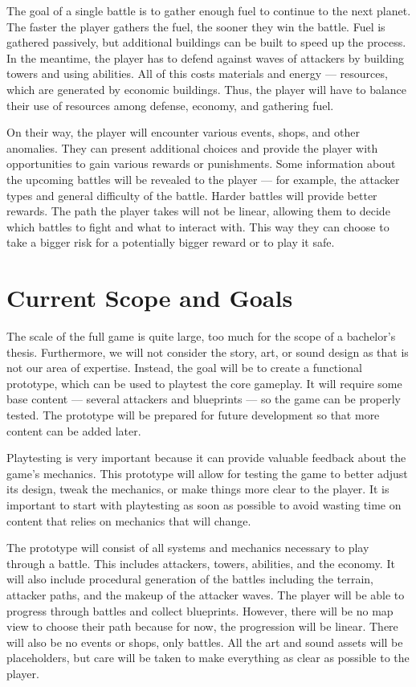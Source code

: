 The goal of a single battle is to gather enough fuel to continue to the next planet.
The faster the player gathers the fuel, the sooner they win the battle.
Fuel is gathered passively, but additional buildings can be built to speed up the process.
In the meantime, the player has to defend against waves of attackers by building towers and using abilities.
All of this costs materials and energy --- resources, which are generated by economic buildings.
Thus, the player will have to balance their use of resources among defense, economy, and gathering fuel.

On their way, the player will encounter various events, shops, and other anomalies.
They can present additional choices and provide the player with opportunities to gain various rewards or punishments.
Some information about the upcoming battles will be revealed to the player --- for example, the attacker types and general difficulty of the battle.
Harder battles will provide better rewards.
The path the player takes will not be linear, allowing them to decide which battles to fight and what to interact with.
This way they can choose to take a bigger risk for a potentially bigger reward or to play it safe.


\section{Current Scope and Goals}

The scale of the full game is quite large, too much for the scope of a bachelor's thesis.
Furthermore, we will not consider the story, art, or sound design as that is not our area of expertise.
Instead, the goal will be to create a functional prototype, which can be used to playtest the core gameplay.
It will require some base content --- several attackers and blueprints --- so the game can be properly tested.
The prototype will be prepared for future development so that more content can be added later.

Playtesting is very important because it can provide valuable feedback about the game's mechanics.
This prototype will allow for testing the game to better adjust its design, tweak the mechanics, or make things more clear to the player.
It is important to start with playtesting as soon as possible to avoid wasting time on content that relies on mechanics that will change.

The prototype will consist of all systems and mechanics necessary to play through a battle.
This includes attackers, towers, abilities, and the economy.
It will also include procedural generation of the battles including the terrain, attacker paths, and the makeup of the attacker waves.
The player will be able to progress through battles and collect blueprints.
However, there will be no map view to choose their path because for now, the progression will be linear.
There will also be no events or shops, only battles.
All the art and sound assets will be placeholders, but care will be taken to make everything as clear as possible to the player.

